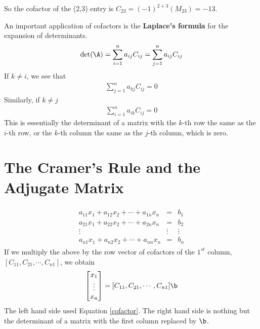{{So the cofactor of the (2,3) entry is $C_{23} = (-1)^{2+3}(M_{23}) = -13$.
}

\vspace{5mm}
\noindent
An important application of cofactors is the {\bf{Laplace's formula}} for the expansion of determinants.
\begin{align}
	\det(\A) = \sum_{i=1}^n a_{ij}C_{ij} = \sum_{j=1}^n a_{ij}C_{ij}
\end{align}
If $k \ne i$, we see that
\begin{align}
	\sum_{j=1}^n a_{kj}C_{ij} = 0	
\end{align}
Similarly, if $k \ne j$
\begin{align}
	\sum_{i=1}^n a_{ik}C_{ij} = 0 \label{cofactor}
\end{align}
This is essentially the determinant of a matrix with the $k$-th row the same as the $i$-th row, or the $k$-th column the same as the $j$-th column, which is zero.

\section{The Cramer's Rule and the Adjugate Matrix}
\begin{align}
	\begin{matrix}a_{11}x_1+a_{12}x_2+\cdots+a_{1n}x_n&=&b_1\\a_{21}x_1+a_{22}x_2+\cdots+a_{2n}x_n&=&b_2\\\vdots&\vdots&\vdots\\a_{n1}x_1+a_{n2}x_2+\cdots+a_{nn}x_n&=&b_n\end{matrix}
\end{align}
If we multiply the above by the row vector of cofactors of the $1^{st}$ column, $[C_{11},C_{21},\cdots,C_{n1}]$, we obtain
\begin{align}
	[\det(\A),0,\cdots,0]\begin{bmatrix}x_1\\ \vdots \\ x_n\end{bmatrix} = [C_{11},C_{21},\cdots,C_{n1}]\b
\end{align}
The left hand side used Equation \ref{cofactor}. The right hand side is nothing but the determinant of a matrix with the first column replaced by $\b$.

}
